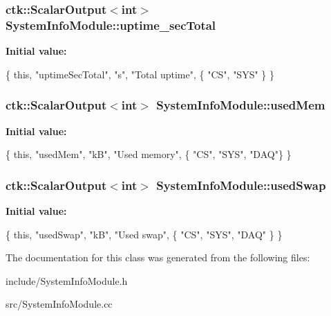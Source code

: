 \subsubsection[{\texorpdfstring{uptime\+\_\+sec\+Total}{uptime_secTotal}}]{\setlength{\rightskip}{0pt plus 5cm}ctk\+::\+Scalar\+Output$<$int$>$ System\+Info\+Module\+::uptime\+\_\+sec\+Total}\hypertarget{classSystemInfoModule_a9f4828355de8c48f5bbc46d279522298}{}\label{classSystemInfoModule_a9f4828355de8c48f5bbc46d279522298}
{\bfseries Initial value\+:}
\begin{DoxyCode}
\{ \textcolor{keyword}{this}, \textcolor{stringliteral}{"uptimeSecTotal"}, \textcolor{stringliteral}{"s"}, \textcolor{stringliteral}{"Total uptime"},
      \{ \textcolor{stringliteral}{"CS"}, \textcolor{stringliteral}{"SYS"} \} \}
\end{DoxyCode}
\subsubsection[{\texorpdfstring{used\+Mem}{usedMem}}]{\setlength{\rightskip}{0pt plus 5cm}ctk\+::\+Scalar\+Output$<$int$>$ System\+Info\+Module\+::used\+Mem}\hypertarget{classSystemInfoModule_a097cf6f7cd0a89bbc09f3cd1abd48fe5}{}\label{classSystemInfoModule_a097cf6f7cd0a89bbc09f3cd1abd48fe5}
{\bfseries Initial value\+:}
\begin{DoxyCode}
\{ \textcolor{keyword}{this}, \textcolor{stringliteral}{"usedMem"}, \textcolor{stringliteral}{"kB"}, \textcolor{stringliteral}{"Used memory"},
    \{ \textcolor{stringliteral}{"CS"}, \textcolor{stringliteral}{"SYS"}, \textcolor{stringliteral}{"DAQ"}\} \}
\end{DoxyCode}
\subsubsection[{\texorpdfstring{used\+Swap}{usedSwap}}]{\setlength{\rightskip}{0pt plus 5cm}ctk\+::\+Scalar\+Output$<$int$>$ System\+Info\+Module\+::used\+Swap}\hypertarget{classSystemInfoModule_a9191ec838fbf10a38023ea6ecbf1386d}{}\label{classSystemInfoModule_a9191ec838fbf10a38023ea6ecbf1386d}
{\bfseries Initial value\+:}
\begin{DoxyCode}
\{ \textcolor{keyword}{this}, \textcolor{stringliteral}{"usedSwap"}, \textcolor{stringliteral}{"kB"}, \textcolor{stringliteral}{"Used swap"},
    \{ \textcolor{stringliteral}{"CS"}, \textcolor{stringliteral}{"SYS"}, \textcolor{stringliteral}{"DAQ"} \} \}
\end{DoxyCode}


The documentation for this class was generated from the following files\+:\begin{DoxyCompactItemize}
\item 
include/System\+Info\+Module.\+h\item 
src/System\+Info\+Module.\+cc\end{DoxyCompactItemize}
